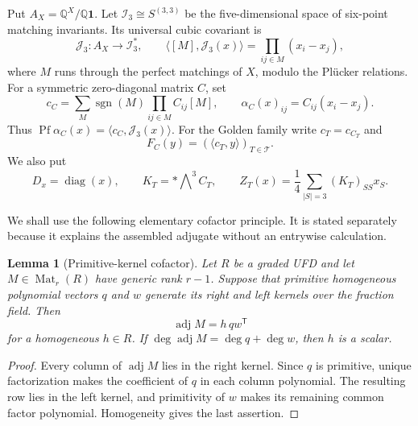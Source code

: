\documentclass[11pt]{article}
\newtheorem{lemma}[theorem]{Lemma}
\theoremstyle{definition}
\theoremstyle{remark}
\newcommand{\cT}{\mathcal T}
\newcommand{\Pf}{\operatorname{Pf}}
\begin{document}
Put \(A_X=\mathbb Q^X/\mathbb Q\mathbf1\).  Let
\(\mathcal I_3\cong S^{(3,3)}\) be the five-dimensional space of
six-point matching invariants.  Its universal cubic covariant is
\[
 \mathcal J_3:A_X\longrightarrow\mathcal I_3^*,\qquad
 \langle[M],\mathcal J_3(x)\rangle
   =\prod_{ij\in M}(x_i-x_j),
\]
where \(M\) runs through the perfect matchings of \(X\), modulo the
Pl\"ucker relations.  For a symmetric zero-diagonal matrix \(C\), set
\[
 c_C=\sum_M\operatorname{sgn}(M)
       \prod_{ij\in M}C_{ij}[M],\qquad
 \alpha_C(x)_{ij}=C_{ij}(x_i-x_j).
\]
Thus \(\Pf\alpha_C(x)=\langle c_C,\mathcal J_3(x)\rangle\).
For the Golden family write \(c_T=c_{C_T}\) and
\[
 F_C(y)=(\langle c_T,y\rangle)_{T\in\cT}.
\]
We also put
\[
 D_x=\operatorname{diag}(x),\qquad
 K_T=*\bigwedge\nolimits^3C_T,\qquad
 Z_T(x)=\frac14\sum_{|S|=3}(K_T)_{SS}x_S.
\]

We shall use the following elementary cofactor principle.  It is stated
separately because it explains the assembled adjugate without an entrywise
calculation.

\begin{lemma}[Primitive-kernel cofactor]
\label{lem:primitive-cofactor}
Let \(R\) be a graded UFD and let \(M\in\operatorname{Mat}_r(R)\) have
generic rank \(r-1\).  Suppose that primitive homogeneous polynomial
vectors \(q\) and \(w\) generate its right and left kernels over the
fraction field.  Then
\[
 \operatorname{adj}M=h\,q w^{\mathsf T}
\]
for a homogeneous \(h\in R\).  If
\(\deg\operatorname{adj}M=\deg q+\deg w\), then \(h\) is a scalar.
\end{lemma}

\begin{proof}
Every column of \(\operatorname{adj}M\) lies in the right kernel.  Since
\(q\) is primitive, unique factorization makes the coefficient of \(q\) in
each column polynomial.  The resulting row lies in the left kernel, and
primitivity of \(w\) makes its remaining common factor polynomial.
Homogeneity gives the last assertion.
\end{proof}
\end{document}
